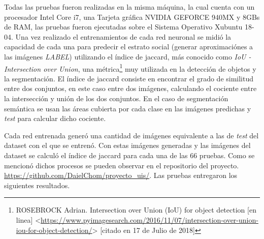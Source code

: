Todas las pruebas fueron realizadas en la misma máquina, la cual cuenta con un procesador Intel Core i7, una Tarjeta gráfica NVIDIA GEFORCE 940MX y 8GBs de RAM, las pruebas fueron ejecutadas sobre el Sistema Operativo Xubuntu 18-04. Una vez realizado el entrenamientos de cada red neuronal se midió la capacidad de cada una para predecir el estrato social (generar aproximaciónes a las imágenes \textit{LABEL}) utilizando el índice de jaccard, más conocido como  \textit{IoU  - Intersection over Union}, una métrica\footnote[14]{ROSEBROCK Adrian. Intersection over Union (IoU) for object detection [en linea] <\url{https://www.pyimagesearch.com/2016/11/07/intersection-over-union-iou-for-object-detection/}> [citado en 17 de Julio de 2018]} muy utilizada en la detección de objetos y la segmentación. El índice de jaccard consiste en encontrar el grado de similitud entre dos conjuntos, en este caso entre dos imágenes, calculando el cociente entre la intersección y unión de los dos conjuntos. En el caso de segmentación semántica se usan las áreas cubierta por cada clase en las imágenes predichas y \textit{test} para calcular dicho cociente.  



Cada red entrenada generó una cantidad de imágenes equivalente a las de \textit{test} del dataset con el que se entrenó. Con estas imágenes generadas y las imágenes del dataset se calculó el índice de jaccard para cada una de las 66 pruebas. Como se mencionó dichos procesos se pueden observar en el repositorio del proyecto. \url{https://github.com/DaielChom/proyecto_uis/}. Las pruebas entregaron los siguientes resultados. 


